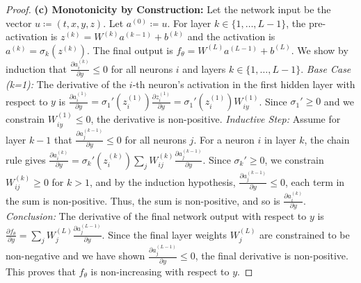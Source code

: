 \documentclass[10pt,a4paper]{amsart}
\begin{document}
\begin{proof}
\textbf{(c) Monotonicity by Construction:} Let the network input be the vector $u \coloneqq (t,x,y,z)$. Let $a^{(0)} \coloneqq u$. For layer $k \in \{1, \dots, L-1\}$, the pre-activation is $z^{(k)} = W^{(k)} a^{(k-1)} + b^{(k)}$ and the activation is $a^{(k)} = \sigma_k(z^{(k)})$. The final output is $f_\theta = W^{(L)}a^{(L-1)} + b^{(L)}$. We show by induction that $\frac{\partial a_i^{(k)}}{\partial y} \le 0$ for all neurons $i$ and layers $k \in \{1, \dots, L-1\}$.
\textit{Base Case (k=1):} The derivative of the $i$-th neuron's activation in the first hidden layer with respect to $y$ is $\frac{\partial a_i^{(1)}}{\partial y} = \sigma_1'(z_i^{(1)}) \frac{\partial z_i^{(1)}}{\partial y} = \sigma_1'(z_i^{(1)}) W_{iy}^{(1)}$. Since $\sigma_1' \ge 0$ and we constrain $W_{iy}^{(1)} \le 0$, the derivative is non-positive.
\textit{Inductive Step:} Assume for layer $k-1$ that $\frac{\partial a_j^{(k-1)}}{\partial y} \le 0$ for all neurons $j$. For a neuron $i$ in layer $k$, the chain rule gives $\frac{\partial a_i^{(k)}}{\partial y} = \sigma_k'(z_i^{(k)}) \sum_j W_{ij}^{(k)} \frac{\partial a_j^{(k-1)}}{\partial y}$. Since $\sigma_k' \ge 0$, we constrain $W_{ij}^{(k)} \ge 0$ for $k>1$, and by the induction hypothesis, $\frac{\partial a_j^{(k-1)}}{\partial y} \le 0$, each term in the sum is non-positive. Thus, the sum is non-positive, and so is $\frac{\partial a_i^{(k)}}{\partial y}$.
\textit{Conclusion:} The derivative of the final network output with respect to $y$ is $\frac{\partial f_\theta}{\partial y} = \sum_j W_{j}^{(L)} \frac{\partial a_j^{(L-1)}}{\partial y}$. Since the final layer weights $W_j^{(L)}$ are constrained to be non-negative and we have shown $\frac{\partial a_j^{(L-1)}}{\partial y} \le 0$, the final derivative is non-positive. This proves that $f_\theta$ is non-increasing with respect to $y$.
\end{proof}
\end{document}
